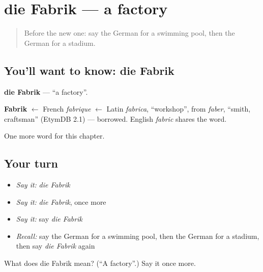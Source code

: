 \section[die Fabrik]{die Fabrik — a factory}

\label{lesson:GE-C106-fabrik}



\begin{quote}
Before the new one: say the German for a swimming pool, then the German for a stadium.
\end{quote}

\subsection*{You'll want to know: die Fabrik}
\textbf{die Fabrik} — \textquotedblleft{}a factory\textquotedblright{}.

\begin{cousinweb}
\textbf{Fabrik} $\leftarrow$ French \emph{fabrique} $\leftarrow$ Latin \emph{fabrica}, \textquotedblleft{}workshop\textquotedblright{}, from \emph{faber}, \textquotedblleft{}smith, craftsman\textquotedblright{} (EtymDB 2.1) — borrowed. English \emph{fabric} shares the word.
\end{cousinweb}

\begin{grammarlens}[title={What you've built}]
One more word for this chapter.
\end{grammarlens}

\subsection*{Your turn}
\begin{itemize}
\raggedright
  \item \emph{Say it:} \emph{die Fabrik}
  \item \emph{Say it:} \emph{die Fabrik}, once more
  \item \emph{Say it:} say \emph{die Fabrik}
  \item \emph{Recall:} say the German for a swimming pool, then the German for a stadium, then say \emph{die Fabrik} again
\end{itemize}

\begin{tcolorbox}[breakable,colback=teal!4,colframe=teal!35!black,title={Before you move on}]
What does die Fabrik mean? (\textquotedblleft{}A factory\textquotedblright{}.) Say it once more.
\end{tcolorbox}
